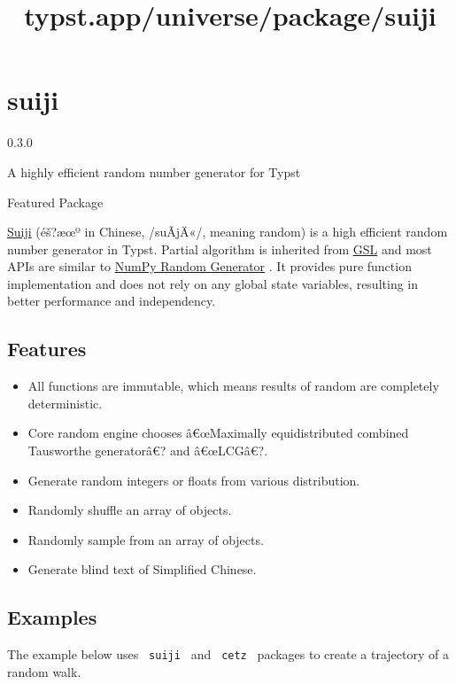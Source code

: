 \title{typst.app/universe/package/suiji}

\label{banner}
\section{suiji}\label{suiji}

{ 0.3.0 }

A highly efficient random number generator for Typst

{ } Featured Package

\label{readme}
\href{https://github.com/liuguangxi/suiji}{Suiji} (éš?æœº in Chinese,
/suÃ­jÄ«/, meaning random) is a high efficient random number generator in
Typst. Partial algorithm is inherited from
\href{https://www.gnu.org/software/gsl}{GSL} and most APIs are similar
to
\href{https://numpy.org/doc/stable/reference/random/generator.html}{NumPy
Random Generator} . It provides pure function implementation and does
not rely on any global state variables, resulting in better performance
and independency.

\subsection{Features}\label{features}

\begin{itemize}
\tightlist
\item
  All functions are immutable, which means results of random are
  completely deterministic.
\item
  Core random engine chooses â€œMaximally equidistributed combined
  Tausworthe generatorâ€? and â€œLCGâ€?.
\item
  Generate random integers or floats from various distribution.
\item
  Randomly shuffle an array of objects.
\item
  Randomly sample from an array of objects.
\item
  Generate blind text of Simplified Chinese.
\end{itemize}

\subsection{Examples}\label{examples}

The example below uses \texttt{\ suiji\ } and \texttt{\ cetz\ } packages
to create a trajectory of a random walk.

